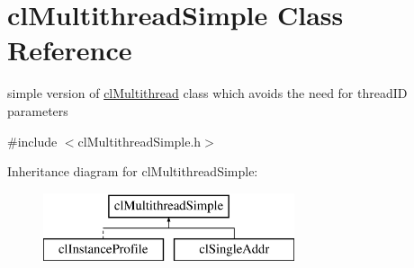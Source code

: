 \hypertarget{classcl_multithread_simple}{
\section{clMultithreadSimple Class Reference}
\label{classcl_multithread_simple}
}


simple version of \hyperlink{classcl_multithread}{clMultithread} class which avoids the need for threadID parameters  




{\ttfamily \#include $<$clMultithreadSimple.h$>$}

Inheritance diagram for clMultithreadSimple:\begin{figure}[H]
\begin{center}
\leavevmode
\includegraphics[height=2.000000cm]{classcl_multithread_simple}
\end{center}
\end{figure}
